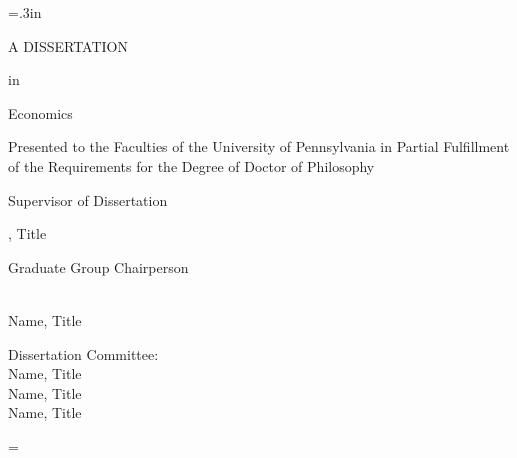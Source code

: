 \large\newlength{\oldparskip}\setlength\oldparskip{\parskip}\parskip=.3in
\thispagestyle{empty}

\begin{center}
    \LARGE \thetitle

    \large \theauthor

    \Large A DISSERTATION

    \large in

    \Large Economics
\end{center}

\noindent\singlespaced\large
Presented to the Faculties of the University of Pennsylvania in Partial
Fulfillment of the Requirements for the Degree of Doctor of Philosophy

\begin{center}
\theyear
\end{center}

\bigskip
\singlespaced
\noindent \begin{minipage}{.45\textwidth}
Supervisor of Dissertation \\
\par\noindent\makebox[2.5in]{\hrulefill}
\theadvisor, Title
\end{minipage}

\bigskip
\noindent Graduate Group Chairperson
\par\noindent\makebox[2.5in]{\hrulefill} \\
\singlespaced
Name, Title\

\noindent
\singlespaced
Dissertation Committee:\\
Name, Title\\
Name, Title\\
Name, Title
\vspace*{\fill}

\normalsize\parskip=\oldparskip
